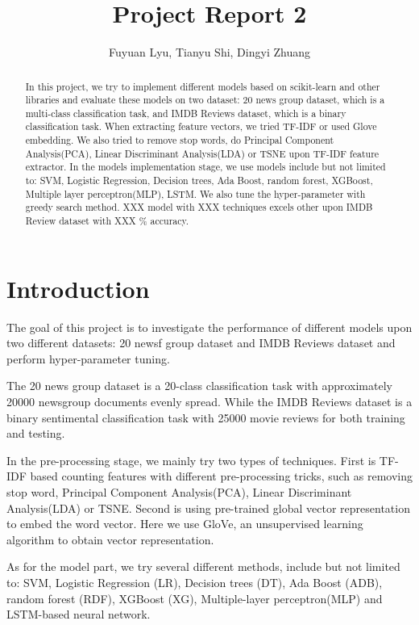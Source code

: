 \documentclass[11pt]{scrartcl}
\title{Project Report 2}
\author{Fuyuan Lyu, Tianyu Shi, Dingyi Zhuang}
\begin{document}
\maketitle

\begin{abstract}
In this project, we try to implement different models based on scikit-learn and other libraries and evaluate these models on two dataset: 20 news group dataset, which is a multi-class classification task, and IMDB Reviews dataset, which is a binary classification task. When extracting feature vectors, we tried TF-IDF or used Glove embedding. We also tried to remove stop words, do Principal Component Analysis(PCA), Linear Discriminant Analysis(LDA) or TSNE upon TF-IDF feature extractor. In the models implementation stage, we use models include but not limited to: SVM, Logistic Regression, Decision trees, Ada Boost, random forest, XGBoost, Multiple layer perceptron(MLP), LSTM. We also tune the hyper-parameter with greedy search method. XXX model with XXX techniques excels other upon IMDB Review dataset with XXX \% accuracy.
\end{abstract}

\section{Introduction}
The goal of this project is to investigate the performance of different models upon two different datasets: 20 newsf group dataset and IMDB Reviews dataset and perform hyper-parameter tuning.

The 20 news group dataset is a 20-class classification task with approximately 20000 newsgroup documents evenly spread\cite{Lang95}. While the IMDB Reviews dataset is a binary sentimental classification task with 25000 movie reviews for both training and testing\cite{maas-EtAl:2011:ACL-HLT2011}.

In the pre-processing stage, we mainly try two types of techniques. First is TF-IDF based counting features with different pre-processing tricks, such as removing stop word, Principal Component Analysis(PCA), Linear Discriminant Analysis(LDA) or TSNE. Second is using pre-trained global vector representation to embed the word vector. Here we use GloVe, an unsupervised learning algorithm to obtain vector representation\cite{pennington2014glove}.

As for the model part, we try several different methods, include but not limited to: SVM, Logistic Regression (LR), Decision trees (DT), Ada Boost (ADB), random forest (RDF), XGBoost (XG), Multiple-layer perceptron(MLP) and LSTM-based neural network.
\end{document}
